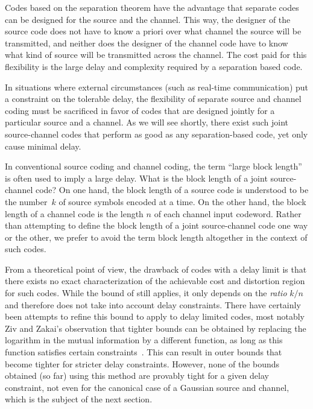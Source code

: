 Codes based on the separation theorem have the advantage that separate codes can
be designed for the source and the channel. This way, the designer of the source
code does not have to know a priori over what channel the source will be
transmitted, and neither does the designer of the channel code have to know what
kind of source will be transmitted across the channel. The cost paid for this
flexibility is the large delay and complexity required by a separation based
code. 

In situations where external circumstances (such as real-time communication) put
a constraint on the tolerable delay, the flexibility of separate source and
channel coding must be sacrificed in favor of codes that are designed jointly
for a particular source and a channel. As we will see shortly, there exist such
joint source-channel codes that perform as good as any separation-based code,
yet only cause minimal delay.

\begin{remark}
  \label{rem:blocklength}
  In conventional source coding and channel coding, the term ``large block
  length'' is often used to imply a large delay. What is the block length of a
  joint source-channel code? On one hand, the block length of a source code is
  understood to be the number~$k$ of source symbols encoded at a time. On the
  other hand, the block length of a channel code is the length $n$ of each
  channel input codeword. Rather than attempting to define the block length of a
  joint source-channel code one way or the other, we prefer to avoid the term
  block length altogether in the context of such codes. 
\end{remark}

From a theoretical point of view, the drawback of codes with a delay limit is
that there exists no exact characterization of the achievable cost and
distortion region for such codes. While the bound of 
still applies, it only depends on the \emph{ratio} $k/n$ and therefore does not
take into account delay constraints. There have certainly been attempts to
refine this bound to apply to delay limited codes, most notably Ziv and Zakai's
observation that tighter bounds can be obtained by replacing the logarithm in
the mutual information by a different function, as long as this function
satisfies certain constraints~\cite{ZivZ1973}. This can result in outer bounds
that become tighter for stricter delay constraints. However, none of the bounds
obtained (so far) using this method are provably tight for a given delay
constraint, not even for the canonical case of a Gaussian source and channel,
which is the subject of the next section.

